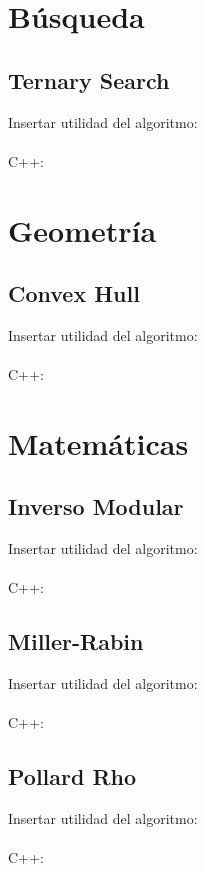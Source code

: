 \documentclass{article}
\begin{document}
\section{Búsqueda}
    \subsection{Ternary Search}
        Insertar utilidad del algoritmo:
        \\ \\
        C++:
        
\pagebreak
\section{Geometría}
    \subsection{Convex Hull}
        Insertar utilidad del algoritmo:
        \\ \\
        C++:
        
\pagebreak
\section{Matemáticas}
    \subsection{Inverso Modular}
        Insertar utilidad del algoritmo:
        \\ \\
        C++:
        
    \subsection{Miller-Rabin}
        Insertar utilidad del algoritmo:
        \\ \\
        C++:
        
    \subsection{Pollard Rho}
        Insertar utilidad del algoritmo:
        \\ \\
        C++:
        
\pagebreak
\end{document}
